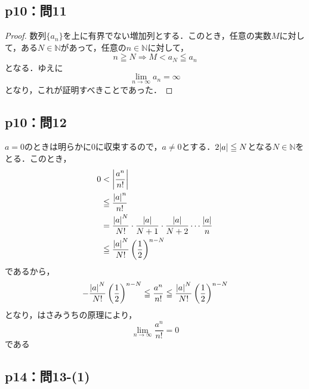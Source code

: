 \documentclass[uplatex,dvipdfmx,a4paper,10pt,fleqn]{jsarticle}
\newenvironment{tleftbar}{\begin{tbleftline}\setlength{\parindent}{1zw}}{\end{tbleftline}}
\begin{document}
    \subsection*{p10：問11}

    \begin{tleftbar}
        \begin{proof}
        数列$\{ a_n \}$を上に有界でない増加列とする．このとき，任意の実数$M$に対して，ある$N \in \mathbb{N}$があって，任意の$n \in \mathbb{N}$に対して，
        \[
            n \geqq N \Longrightarrow  M < a_N \leqq a_n
        \]
        となる．ゆえに
        \[
            \lim_{n \to \infty} a_n=\infty
        \]
        となり，これが証明すべきことであった．
        \end{proof}
    \end{tleftbar}
    
         
        \subsection*{p10：問12}

\begin{tleftbar}
    $a=0$のときは明らかに$0$に収束するので，$a \ne 0$とする．$2\abs{a} \leqq N$となる$N \in \mathbb{N}$をとる．このとき，
    \begin{align*}
         0 &< \abs{ \frac{a^n}{n!} } \\
         &\leqq \frac{\abs{a}^n}{n!} \\
         &= \frac{\abs{a}^{N}}{N!} \cdot \frac{\abs{a}}{N+1} \cdot \frac{\abs{a}}{N+2} \dotsm \frac{\abs{a}}{n} \\
         & \leqq  \frac{\abs{a}^{N}}{N!} \left(\frac{1}{2} \right)^{n-N}
    \end{align*}
    であるから，
    \[
        - \frac{\abs{a}^{N}}{N!} \left(\frac{1}{2} \right)^{n-N} \leqq  \frac{a^n}{n!} \leqq \frac{\abs{a}^{N}}{N!} \left(\frac{1}{2} \right)^{n-N}
    \]
    となり，はさみうちの原理により，
    \[
        \lim_{n \to \infty} \frac{a^n}{n!} =0
    \]
    である
\end{tleftbar}

\newpage


\subsection*{p14：問13-(1)}
\end{document}
